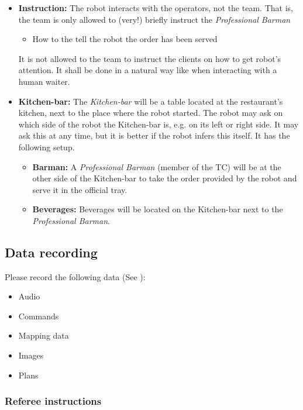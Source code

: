 \begin{itemize}
	\item \textbf{Instruction:} The robot interacts with the operators, not the team. That is, the team is only allowed to (very!) briefly instruct the \textit{Professional Barman} 
	\begin{itemize} 
		\item How to the tell the robot the order has been served
	\end{itemize}
	It is not allowed to the team to instruct the clients on how to get robot's attention. It shall be done in a natural way like when interacting with a human waiter.

	\item \textbf{Kitchen-bar:} The \textit{Kitchen-bar} will be a table located at the restaurant's kitchen, next to the place where the robot started. 
	The robot may ask on which side of the robot the Kitchen-bar is, e.g. on its left or right side. It may ask this at any time, but it is better if the robot infers this itself. 
	It has the following setup.
	\begin{itemize}
		\item \textbf{Barman:} A \textit{Professional Barman} (member of the TC) will be at the other side of the Kitchen-bar to take the order provided by the robot and serve it in the official tray.
		\item \textbf{Beverages:} Beverages will be located on the Kitchen-bar next to the \textit{Professional Barman}.
	\end{itemize}

\end{itemize}

\subsection{Data recording}
  Please record the following data (See ):
  \begin{itemize}
   \item Audio
   \item Commands
   \item Mapping data
   \item Images
   \item Plans
  \end{itemize}

\subsubsection{Referee instructions}

